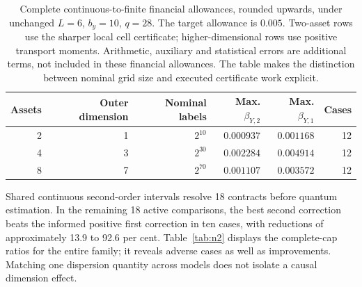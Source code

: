 \documentclass[11pt]{article}
\begin{document}
\begin{table}[ht]
\centering\small
\begin{tabular}{rrrrrr}
\toprule
Assets&Outer dimension&Nominal labels&Max. $\beta_{Y,2}$&Max. $\beta_{Y,1}$&Cases\\
\midrule
2&1&$2^{10}$&$0.000937$&$0.001168$&12\\
4&3&$2^{30}$&$0.002284$&$0.004914$&12\\
8&7&$2^{70}$&$0.001107$&$0.003572$&12\\
\bottomrule
\end{tabular}
\caption{Complete continuous-to-finite financial allowances, rounded
upwards, under unchanged $L=6$, $b_y=10$, $q=28$. The target allowance is
$0.005$. Two-asset rows use the sharper local cell certificate;
higher-dimensional rows use positive transport moments. Arithmetic,
auxiliary and statistical errors are additional terms, not included in
these financial allowances. The table makes the distinction between
nominal grid size and executed certificate work explicit.}
\label{tab:transfer}
\end{table}

Shared continuous second-order intervals resolve 18 contracts before
quantum estimation. In the remaining 18 active comparisons, the best
second correction beats the informed positive first correction in ten
cases, with reductions of approximately 13.9 to 92.6 per cent.
Table~\ref{tab:n2} displays the complete-cap ratios for the entire family;
it reveals adverse cases as well as improvements. Matching one dispersion
quantity across models does not isolate a causal dimension effect.
\end{document}
